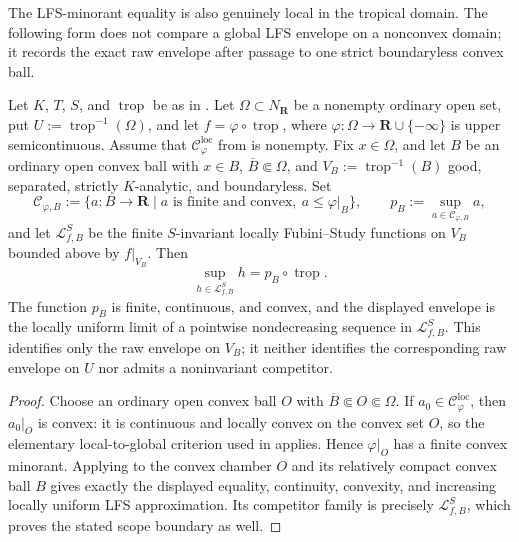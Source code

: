The LFS-minorant equality is also genuinely local in the tropical domain.
The following form does not compare a global LFS envelope on a nonconvex
domain; it records the exact raw envelope after passage to one strict
boundaryless convex ball.
\begin{corollary}
\label{cor:p033-invariant-toric-germwise-lfs-envelope}
Let \(K\), \(T\), \(S\), and \(\operatorname{trop}\) be as in
.  Let
\(\Omega\subset N_{\mathbf R}\) be a nonempty ordinary open set, put
\(U:=\operatorname{trop}^{-1}(\Omega)\), and let
\(f=\varphi\circ\operatorname{trop}\), where
\(\varphi:\Omega\to\mathbf R\cup\{-\infty\}\) is upper semicontinuous.
Assume that \(\mathcal C^{\mathrm{loc}}_\varphi\) from
 is nonempty.  Fix
\(x\in\Omega\), and let \(B\) be an ordinary open convex ball with
\(x\in B\), \(\overline B\Subset\Omega\), and
\(V_B:=\operatorname{trop}^{-1}(B)\) good, separated, strictly
\(K\)-analytic, and boundaryless.  Set
\[
 \mathcal C_{\varphi,B}
 :=\{a:B\longrightarrow\mathbf R\mid
       a\text{ is finite and convex},\ a\leq\varphi|_B\},
 \qquad
 p_B:=\sup_{a\in\mathcal C_{\varphi,B}}a,
\]
and let \(\mathcal L^S_{f,B}\) be the finite \(S\)-invariant locally
Fubini--Study functions on \(V_B\) bounded above by \(f|_{V_B}\).  Then
\[
                  \sup_{h\in\mathcal L^S_{f,B}}h
                  =p_B\circ\operatorname{trop}.
\]
The function \(p_B\) is finite, continuous, and convex, and the displayed
envelope is the locally uniform limit of a pointwise nondecreasing sequence
in \(\mathcal L^S_{f,B}\).  This identifies only the raw envelope on
\(V_B\); it neither identifies the corresponding raw envelope on \(U\) nor
admits a noninvariant competitor.
\end{corollary}
\begin{proof}
Choose an ordinary open convex ball \(O\) with
\(\overline B\Subset O\Subset\Omega\).  If
\(a_0\in\mathcal C^{\mathrm{loc}}_\varphi\), then \(a_0|_O\) is convex:
it is continuous and locally convex on the convex set \(O\), so the
elementary local-to-global criterion used in
 applies.  Hence
\(\varphi|_O\) has a finite convex minorant.  Applying
 to the convex chamber
\(O\) and its relatively compact convex ball \(B\) gives exactly the
displayed equality, continuity, convexity, and increasing locally uniform
LFS approximation.  Its competitor family is precisely
\(\mathcal L^S_{f,B}\), which proves the stated scope boundary as well.
\end{proof}

